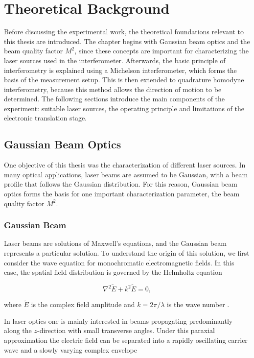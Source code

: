\chapter{Theoretical Background}
\label{chap:theoretical_background}
\thispagestyle{empty}

Before discussing the experimental work, the theoretical foundations relevant to this thesis are introduced. The chapter begins with Gaussian beam optics and the beam quality factor \(M^2\), since these concepts are important for characterizing the laser sources used in the interferometer. Afterwards, the basic principle of interferometry is explained using a Michelson interferometer, which forms the basis of the measurement setup. This is then extended to quadrature homodyne interferometry, because this method allows the direction of motion to be determined. The following sections introduce the main components of the experiment: suitable laser sources, the operating principle and limitations of the electronic translation stage.
\section{Gaussian Beam Optics}

One objective of this thesis was the characterization of different laser sources. In many optical applications, laser beams are assumed to be Gaussian, with a beam profile that follows the Gaussian distribution. For this reason, Gaussian beam optics forms the basis for one important characterization parameter, the beam quality factor \(M^2\).  

\subsection{Gaussian Beam}

Laser beams are solutions of Maxwell's equations, and the Gaussian beam represents a particular solution. To understand the origin of this solution, we first consider the wave equation for monochromatic electromagnetic fields. In this case, the spatial field distribution is governed by the Helmholtz equation

\begin{equation}
\nabla^2 \tilde{E} + k^2\tilde{E} = 0,
\end{equation}

where \(\tilde{E}\) is the complex field amplitude and \(k=2\pi/\lambda\) is the wave number .

In laser optics one is mainly interested in beams propagating predominantly along the \(z\)-direction with small transverse angles. Under this paraxial approximation the electric field can be separated into a rapidly oscillating carrier wave and a slowly varying complex envelope

